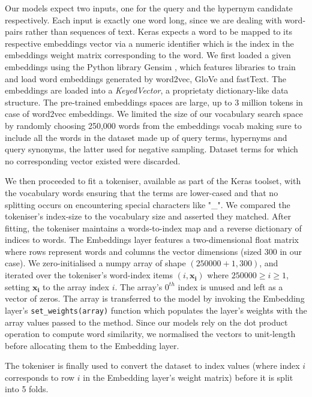 Our models expect two inputs, one for the query and the hypernym candidate respectively.  Each input is exactly one word long, since we are dealing with word-pairs rather than sequences of text.  Keras expects a word to be mapped to its respective embeddings vector via a numeric identifier which is the index in the embeddings weight matrix corresponding to the word.  We first loaded a given embeddings using the Python library Gensim \citep{rehurek_lrec}, which features libraries to train and load word embeddings generated by word2vec, GloVe and fastText.  The embeddings are loaded into a \textit{KeyedVector}, a proprietaty dictionary-like data structure.  The pre-trained embeddings spaces are large, up to 3 million tokens in case of word2vec embeddings.  We limited the size of our vocabulary search space by randomly choosing 250,000 words from the embeddings vocab making sure to include all the words in the dataset made up of query terms, hypernyms and query synonyms, the latter used for negative sampling.  Dataset terms for which no corresponding vector existed were discarded.

We then proceeded to fit a tokeniser, available as part of the Keras toolset, with the vocabulary words ensuring that the terms are lower-cased and that no splitting occurs on encountering special characters like "\_".  We compared the tokeniser's index-size to the vocabulary size and asserted they matched.  After fitting, the tokeniser maintains a words-to-index map and a reverse dictionary of indices to words.  The Embeddings layer features a two-dimensional float matrix where rows represent words and columns the vector dimensions (sized 300 in our case).  We zero-initialised a numpy array of shape $(250000 + 1, 300)$, and iterated over the tokeniser's word-index items $(i, \bm{x_i})$ where $250000 \geq i \geq 1$, setting $\bm{x_i}$ to the array index $i$.  The array's $0^{th}$ index is unused and left as a vector of zeros.  The array is transferred to the model by invoking the Embedding layer's \texttt{set\_weights(array)} function which populates the layer's weights with the array values passed to the method.  Since our models rely on the dot product operation to compute word similarity, we normalised the vectors to unit-length before allocating them to the Embedding layer.

The tokeniser is finally used to convert the dataset to index values (where index $i$ corresponds to row $i$ in the Embedding layer's weight matrix) before it is split into 5 folds.

